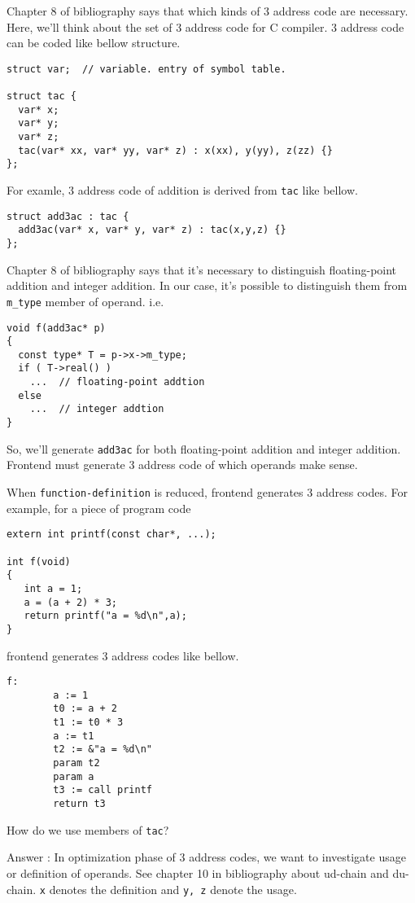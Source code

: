 \label{_3ac_e001}
Chapter 8 of bibliography \cite{doragon} says that
which kinds of 3 address code are necessary.
Here, we'll think about the set of 3 address code for C compiler.
3 address code can be coded like bellow structure.
\begin{verbatim}
struct var;  // variable. entry of symbol table.

struct tac {
  var* x;
  var* y;
  var* z;
  tac(var* xx, var* yy, var* z) : x(xx), y(yy), z(zz) {}
};
\end{verbatim}
For examle, 3 address code of addition is
derived from {\tt{tac}} like bellow.
\begin{verbatim}
struct add3ac : tac {
  add3ac(var* x, var* y, var* z) : tac(x,y,z) {}
};
\end{verbatim}
Chapter 8 of bibliography \cite{doragon} says that
it's necessary to distinguish floating-point addition and
integer addition. In our case, it's possible to distinguish
them from {\tt {m\_type}} member of operand. i.e.
\begin{verbatim}
void f(add3ac* p)
{
  const type* T = p->x->m_type;
  if ( T->real() )
    ...  // floating-point addtion
  else
    ...  // integer addtion
}
\end{verbatim}
So, we'll generate {\tt{add3ac}} for both floating-point addition
and integer addition. Frontend must generate 3 address code
of which operands make sense.

When {\tt{function-definition}} is reduced, frontend generates
3 address codes. For example, for a piece of program code
\begin{verbatim}
extern int printf(const char*, ...);

int f(void)
{
   int a = 1;
   a = (a + 2) * 3;
   return printf("a = %d\n",a);
}
\end{verbatim}
frontend generates 3 address codes like bellow.
\begin{verbatim}
f:
        a := 1
        t0 := a + 2
        t1 := t0 * 3
        a := t1
        t2 := &"a = %d\n"
        param t2
        param a
        t3 := call printf
        return t3
\end{verbatim}

\begin{QandA}
How do we use members of {\tt{tac}}?

Answer : In optimization phase of 3 address codes, we want to
investigate usage or definition of operands. See chapter 10 in
bibliography \cite{doragon} about ud-chain and du-chain.
{\tt{x}} denotes the definition and {\tt{y, z}} denote the usage.
\end{QandA}

